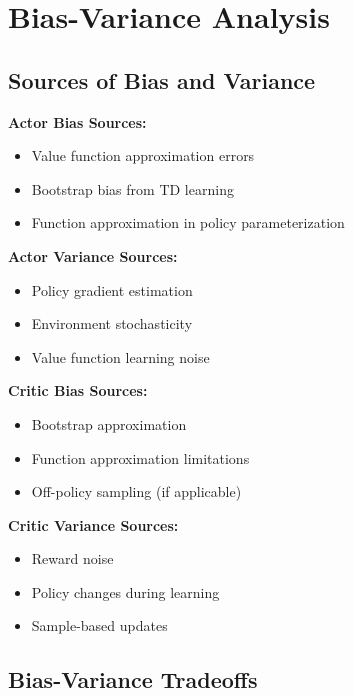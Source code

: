 \section{Bias-Variance Analysis}

\subsection{Sources of Bias and Variance}

\textbf{Actor Bias Sources:}
\begin{itemize}
    \item Value function approximation errors
    \item Bootstrap bias from TD learning
    \item Function approximation in policy parameterization
\end{itemize}

\textbf{Actor Variance Sources:}
\begin{itemize}
    \item Policy gradient estimation
    \item Environment stochasticity
    \item Value function learning noise
\end{itemize}

\textbf{Critic Bias Sources:}
\begin{itemize}
    \item Bootstrap approximation
    \item Function approximation limitations
    \item Off-policy sampling (if applicable)
\end{itemize}

\textbf{Critic Variance Sources:}
\begin{itemize}
    \item Reward noise
    \item Policy changes during learning
    \item Sample-based updates
\end{itemize}

\subsection{Bias-Variance Tradeoffs}

